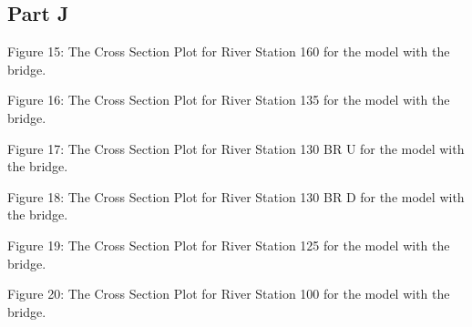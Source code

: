 \documentclass[]{article}
\begin{document}
\subsection{Part J}
 \begin{minipage}[t]{\linewidth}
	\raggedright
	
	\medskip
	\begin{center} 
		Figure 15: The Cross Section Plot for River Station 160 for the model with the bridge.
	\end{center} 
\bigskip
	\raggedright
{}

\medskip
\begin{center} 
	Figure 16: The Cross Section Plot for River Station 135 for the model with the bridge.
\end{center}
\end{minipage}
 \begin{minipage}[t]{\linewidth}
	\raggedright
	
	\medskip
	\begin{center} 
		Figure 17: The Cross Section Plot for River Station 130 BR U for the model with the bridge.
	\end{center} 
	\bigskip
	\raggedright
	
	\medskip
	\begin{center} 
		Figure 18: The Cross Section Plot for River Station 130 BR D for the model with the bridge.
	\end{center}
\end{minipage}
 \begin{minipage}[t]{\linewidth}
	\raggedright
	
	\medskip
	\begin{center} 
		Figure 19: The Cross Section Plot for River Station 125 for the model with the bridge.
	\end{center} 
	\bigskip
	\raggedright
	
	\medskip
	\begin{center} 
		Figure 20: The Cross Section Plot for River Station 100 for the model with the bridge.
	\end{center}
\end{minipage}
\end{document}
